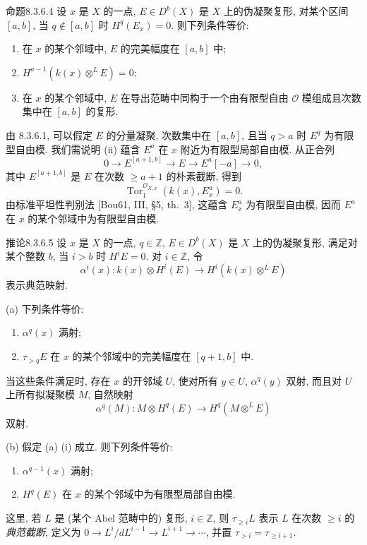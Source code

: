 \begin{origstatement}{命题}{8.3.6.4}\label{ch08:prop8364}
设 $x$ 是 $X$ 的一点, $E\in D^b(X)$ 是 $X$ 上的伪凝聚复形, 对某个区间 $[a,b]$, 当 $q\notin[a,b]$ 时 $H^q(E_x)=0$. 则下列条件等价:
\begin{enumerate}
\item[(i)] 在 $x$ 的某个邻域中, $E$ 的完美幅度在 $[a,b]$ 中;
\item[(ii)] $H^{a-1}(k(x)\otimes^LE)=0$;
\item[(iii)] 在 $x$ 的某个邻域中, $E$ 在导出范畴中同构于一个由有限型自由 $\mathcal O$ 模组成且次数集中在 $[a,b]$ 的复形.
\end{enumerate}
\end{origstatement}
由 8.3.6.1, 可以假定 $E$ 的分量凝聚, 次数集中在 $[a,b]$, 且当 $q>a$ 时 $E^q$ 为有限型自由模. 我们需说明 (ii) 蕴含 $E^a$ 在 $x$ 附近为有限型局部自由模. 从正合列
\[0\longrightarrow E^{[a+1,b]}\longrightarrow E\longrightarrow E^a[-a]\longrightarrow0,\]
其中 $E^{[a+1,b]}$ 是 $E$ 在次数 $\geq a+1$ 的朴素截断, 得到
\[\operatorname{Tor}_1^{\mathcal O_{X,x}}(k(x),E_x^a)=0.\]
由标准平坦性判别法 [Bou61, III, §5, th.~3], 这蕴含 $E_x^a$ 为有限型自由模, 因而 $E^a$ 在 $x$ 的某个邻域中为有限型自由模.

\begin{origstatement}{推论}{8.3.6.5}\label{ch08:cor8365}
设 $x$ 是 $X$ 的一点, $q\in\mathbb Z$, $E\in D^b(X)$ 是 $X$ 上的伪凝聚复形, 满足对某个整数 $b$, 当 $i>b$ 时 $H^iE=0$. 对 $i\in\mathbb Z$, 令
\[\alpha^i(x):k(x)\otimes H^i(E)\longrightarrow H^i(k(x)\otimes^LE)\]
表示典范映射.

(a) 下列条件等价:
\begin{enumerate}
\item[(i)] $\alpha^q(x)$ 满射;
\item[(ii)] $\tau_{>q}E$ 在 $x$ 的某个邻域中的完美幅度在 $[q+1,b]$ 中.
\end{enumerate}
当这些条件满足时, 存在 $x$ 的开邻域 $U$, 使对所有 $y\in U$, $\alpha^q(y)$ 双射, 而且对 $U$ 上所有拟凝聚模 $M$, 自然映射
\[\alpha^q(M):M\otimes H^q(E)\longrightarrow H^q(M\otimes^LE)\]
双射.

(b) 假定 (a) (i) 成立. 则下列条件等价:
\begin{enumerate}
\item[(i)] $\alpha^{q-1}(x)$ 满射;
\item[(ii)] $H^q(E)$ 在 $x$ 的某个邻域中为有限型局部自由模.
\end{enumerate}
\end{origstatement}
这里, 若 $L$ 是 (某个 Abel 范畴中的) 复形, $i\in\mathbb Z$, 则 $\tau_{\geq i}L$ 表示 $L$ 在次数 $\geq i$ 的\emph{典范截断}, 定义为 $0\to L^i/dL^{i-1}\to L^{i+1}\to\cdots$, 并置 $\tau_{>i}=\tau_{\geq i+1}$.

